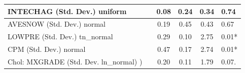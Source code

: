 \begin{table}
\begin{center}
\begin{tabular}{|l|l|c|c|c|l|}
			\hline
			INTECHAG (Std. Dev.) uniform &  & 0.08 & 0.24 & 0.34 & 0.74 \\
			\hline
			AVESNOW (Std. Dev.) normal &  & 0.19 & 0.45 & 0.43 & 0.67 \\
			\hline
			LOWPRE (Std. Dev.) tn_normal &  & 0.29 & 0.10 & 2.75 & 0.01* \\
			\hline
			CPM (Std. Dev.) normal &  & 0.47 & 0.17 & 2.74 & 0.01* \\
			\hline
			 Chol: MXGRADE (Std. Dev. ln_normal) ) &  & 0.20 & 0.11 & 1.79 & 0.07. \\
			\hline
		\end{tabular}
	\end{center}
\end{table}